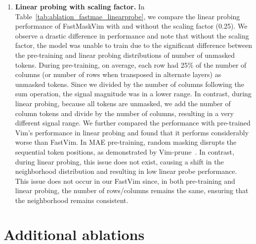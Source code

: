 \begin{enumerate}
\item \textbf{Linear probing with scaling factor.} In Table~\ref{tab:ablation_fastmae_linearprobe}, we compare the linear probing performance of FastMaskVim with and without the scaling factor (0.25). We observe a drastic difference in performance and note that without the scaling factor, the model was unable to train due to the significant difference between the pre-training and linear probing distributions of number of unmasked tokens. During pre-training, on average, each row had 25\% of the number of columns (or number of rows when transposed in alternate layers) as unmasked tokens. Since we divided by the number of columns following the sum operation, the signal magnitude was in a lower range. In contrast, during linear probing, because all tokens are unmasked, we add the number of column tokens and divide by the number of columns, resulting in a very different signal range. We further compared the performance with pre-trained Vim's performance in linear probing and found that it performs considerably worse than FastVim. In MAE pre-training, random masking disrupts the sequential token positions, as demonstrated by Vim-prune~\cite{zhan2024exploring}. In contrast, during linear probing, this issue does not exist, causing a shift in the neighborhood distribution and resulting in low linear probe performance. This issue does not occur in our FastVim since, in both pre-training and linear probing, the number of rows/columns remains the same, ensuring that the neighborhood remains consistent. 

\begin{table}[!h]
    \caption{Effect of scaling factor in linear probing} 
    \begin{center}
\end{center}
    \label{tab:ablation_fastmae_linearprobe}
\end{table}

\end{enumerate}




\section{Additional ablations}
\label{additional_ablations}


